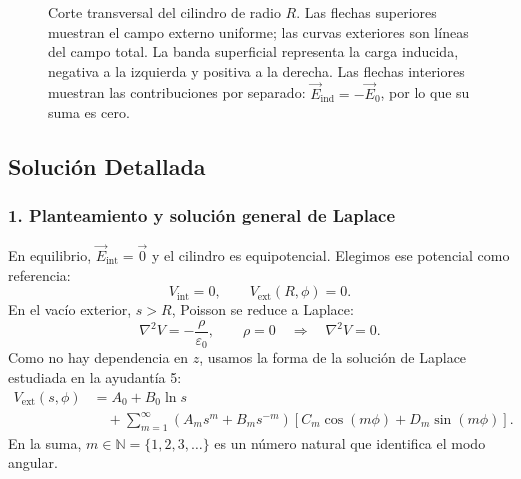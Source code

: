 \documentclass[11pt]{article}
\begin{document}
\begin{figure}[!htbp]
\caption{Corte transversal del cilindro de radio $R$. Las flechas
superiores muestran el campo externo uniforme; las curvas exteriores
son líneas del campo total. La banda superficial representa la carga
inducida, negativa a la izquierda y positiva a la derecha. Las flechas
interiores muestran las contribuciones por separado:
$\vec E_{\mathrm{ind}}=-\vec E_0$, por lo que su suma es cero.}
\label{fig:cilindro-polarizado}
\end{figure}

\subsection*{Solución Detallada}

\subsubsection*{1. Planteamiento y solución general de Laplace}
En equilibrio, $\vec{E}_{\mathrm{int}}=\vec{0}$ y el cilindro es
equipotencial. Elegimos ese potencial como referencia:
\[
 V_{\mathrm{int}}=0,\qquad V_{\mathrm{ext}}(R,\phi)=0.
\]
En el vacío exterior, $s>R$, Poisson se reduce a Laplace:
\[
 \nabla^2V=-\frac{\rho}{\varepsilon_0},\qquad \rho=0
 \quad\Longrightarrow\quad \nabla^2V=0.
\]
Como no hay dependencia en $z$, usamos la forma de la solución de
Laplace estudiada en la ayudantía 5:
\begin{equation}
 \begin{aligned}
 V_{\mathrm{ext}}(s,\phi)
 &=A_0+B_0\ln s\\
 &\quad+\sum_{m=1}^{\infty}
 (A_ms^m+B_ms^{-m})
 [C_m\cos(m\phi)+D_m\sin(m\phi)].
 \end{aligned}
 \label{eq:cilindro-general}
\end{equation}
En la suma, $m\in\mathbb{N}=\{1,2,3,\ldots\}$ es un número natural
que identifica el modo angular.
\end{document}
